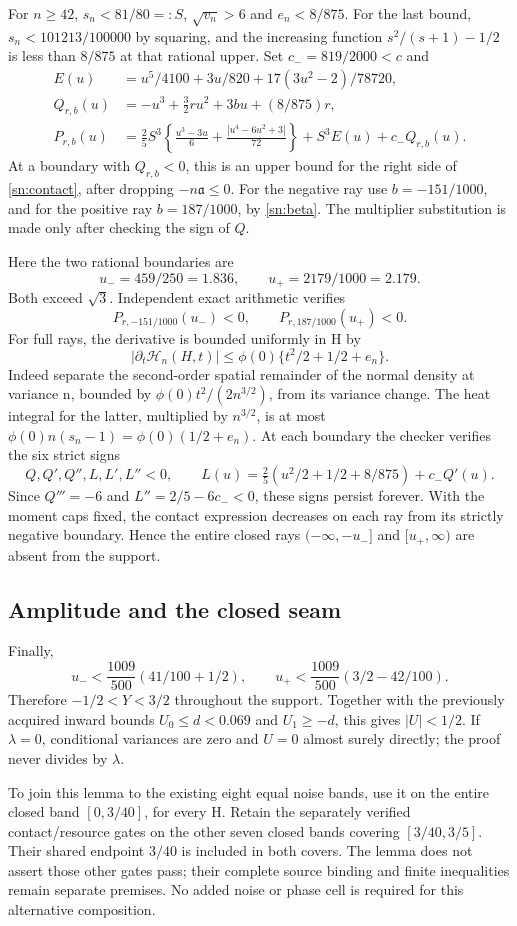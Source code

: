 For $n\ge42$, $s_n<81/80=:S$, $\sqrt{v_n}>6$ and $e_n<8/875$.
For the last bound, $s_n<101213/100000$ by squaring, and the increasing
function $s^2/(s+1)-1/2$ is less than $8/875$ at that rational upper.
Set $c_-=819/2000<c$ and
\begin{align*}
 E(u)&=u^5/4100+3u/820+17(3u^2-2)/78720,\\
 Q_{r,b}(u)&=-u^3+\tfrac32ru^2+3bu+(8/875)r,\\
 P_{r,b}(u)&=\tfrac25S^3\left\{\frac{u^3-3u}{6}
                     +\frac{|u^4-6u^2+3|}{72}\right\}
                    +S^3E(u)+c_-Q_{r,b}(u).
\end{align*}
At a boundary with $Q_{r,b}<0$, this is an upper bound for the right
side of \eqref{sn:contact}, after dropping $-n\mathfrak a\le0$.
For the negative ray use $b=-151/1000$, and for the positive ray
$b=187/1000$, by \eqref{sn:beta}. The multiplier substitution is made
only after checking the sign of $Q$.

Here the two rational boundaries are
\[
 u_-=459/250=1.836,\qquad u_+=2179/1000=2.179.
\]
Both exceed $\sqrt3$. Independent exact arithmetic verifies
\[
 P_{r,-151/1000}(u_-)<0,\qquad P_{r,187/1000}(u_+)<0.
\]
For full rays, the derivative is bounded uniformly in H by
\[
 |\partial_t\mathcal H_n(H,t)|
 \le\phi(0)\{t^2/2+1/2+e_n\}.
\]
Indeed separate the second-order spatial remainder of the normal density
at variance n, bounded by $\phi(0)t^2/(2n^{3/2})$, from its variance
change. The heat integral for the latter, multiplied by $n^{3/2}$,
is at most $\phi(0)n(s_n-1)=\phi(0)(1/2+e_n)$.
At each boundary the checker verifies the six strict signs
\[
 Q,Q',Q'',L,L',L''<0,\qquad
 L(u)=\tfrac25(u^2/2+1/2+8/875)+c_-Q'(u).
\]
Since $Q'''=-6$ and $L''=2/5-6c_-<0$, these signs persist forever.
With the moment caps fixed, the contact expression decreases on each
ray from its strictly negative boundary. Hence the entire closed rays
$(-\infty,-u_-]$ and $[u_+,\infty)$ are absent from the support.

\subsection{Amplitude and the closed seam}
Finally,
\[
 u_-<\frac{1009}{500}(41/100+1/2),\qquad
 u_+<\frac{1009}{500}(3/2-42/100).
\]
Therefore $-1/2<Y<3/2$ throughout the support. Together with the
previously acquired inward bounds $U_0\le d<0.069$ and $U_1\ge-d$, this
gives $|U|<1/2$. If $\lambda=0$, conditional variances are zero and
$U=0$ almost surely directly; the proof never divides by $\lambda$.

To join this lemma to the existing eight equal noise bands, use it on
the entire closed band $[0,3/40]$, for every H. Retain the separately
verified contact/resource gates on the other seven closed bands covering
$[3/40,3/5]$. Their shared endpoint $3/40$ is included in both covers.
The lemma does not assert those other gates pass; their complete source
binding and finite inequalities remain separate premises. No added noise
or phase cell is required for this alternative composition.
